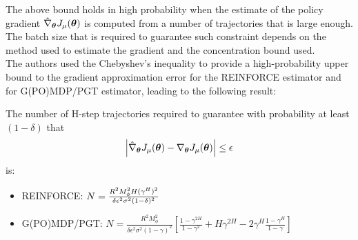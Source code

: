The above bound holds in high probability when the estimate of the policy gradient $\hat{\nabla}_{{\boldsymbol{\theta}}}J_\mu({\boldsymbol{\theta}})$ is computed from a number of trajectories that is large enough. The batch size that is required to guarantee such constraint depends on the method used to estimate the gradient and the concentration bound used.\\
The authors used the Chebyshev's inequality to provide a high-probability upper bound to the gradient approximation error for the REINFORCE estimator and for G(PO)MDP/PGT estimator, leading to the following result:
\begin{corollary}
The number of H-step trajectories required to guarantee with probability at least $(1-\delta)$ that 
\[
\left| \hat{\nabla}_{{\boldsymbol{\theta}}}J_\mu({\boldsymbol{\theta}}) - \nabla_{{\boldsymbol{\theta}}}J_\mu({\boldsymbol{\theta}}) \right|\leq \epsilon
\]
is:
\begin{itemize}
\item REINFORCE: $N=\frac{R^2M_\phi^2 H(\-\gamma^H)^2}{\delta\epsilon^2\sigma^2(1-\delta)^2}$
\item G(PO)MDP/PGT: $N=\frac{R^2M_\phi^2}{\delta\epsilon^2\sigma^2(1-\gamma)^2}\left[ \frac{1-\gamma^{2H}}{1-\gamma^2} + H\gamma^{2H} - 2 \gamma^H\frac{1-\gamma^H}{1-\gamma} \right]$
\end{itemize}
\end{corollary}



